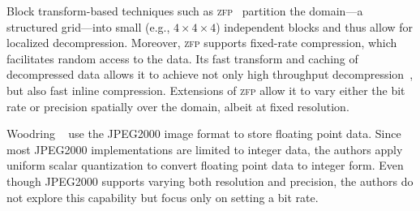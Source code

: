 
\newcommand{\zfp}{\textsc{zfp}\xspace}
Block transform-based techniques such as \zfp~\cite{zfp2014} partition the domain---a structured
grid---into small (e.g., $4 \times 4 \times 4$) independent blocks and thus allow for localized
decompression. Moreover, \zfp supports fixed-rate compression, which facilitates random access to
the data. Its fast transform and caching of decompressed data allows it to achieve not only high
throughput decompression~\cite{hvq}, but also fast inline compression. Extensions of \zfp allow it
to vary either the bit rate or precision spatially over the domain, albeit at fixed resolution.


Woodring \etal~\cite{woodring2011} use the JPEG2000 image format to store floating point data.
Since most JPEG2000 implementations are limited to integer data, the authors apply uniform scalar
quantization to convert floating point data to integer form. Even though JPEG2000 supports varying
both resolution and precision, the authors do not explore this capability but focus only on setting
a bit rate.

